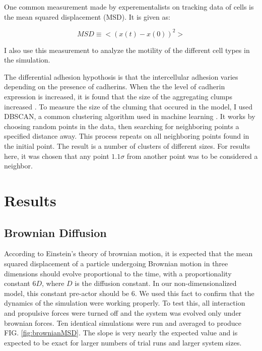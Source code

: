 \documentclass[aps,prb,twocolumn,groupedaddress,nofootinbib,floatfix]{revtex4}
\begin{document}
One common measurement made by experementalists on tracking data of cells is the mean squared displacement (MSD).
It is given as:

\begin{equation}
  MSD \equiv <(x(t) - x(0))^2>
\end{equation}

I also use this measurement to analyze the motility of the different cell types in the simulation.

The differential adhesion hypothosis is that the intercellular adhesion varies depending on the presence of cadherins.
When the the level of cadherin expression is increased, it is found that the size of the aggregating clumps increased \cite{Foty}.
To measure the size of the cluming that occured in the model, I used DBSCAN, a common clustering algorithm used in machine learning \cite{Ester}. 
It works by choosing random points in the data, then searching for neighboring points a specified distance away.
This process repeats on all neighboring points found in the initial point.
The result is a number of clusters of different sizes.
For results here, it was chosen that any point $1.1\sigma$ from another point was to be considered a neighbor.

\section{Results}


\subsection{Brownian Diffusion}
According to Einstein's theory of brownian motion, it is expected that the mean
squared displacement of a particle undergoing Brownian motion in three dimensions should evolve proportional to the time, with a proportionality constant $6 D$, where $D$ is the diffusion constant. In our non-dimensionalized model, this constant pre-actor should be $6$. We used this fact to confirm that the dynamics of the simulation were working properly. To test this, all interaction and propulsive forces were turned off and the system was evolved only under brownian forces. Ten identical simulations were run and averaged to produce FIG. \ref{fig:brownianMSD}. The slope is very nearly the expected value and is expected to be exact for larger numbers of trial runs and larger system sizes.
\end{document}
